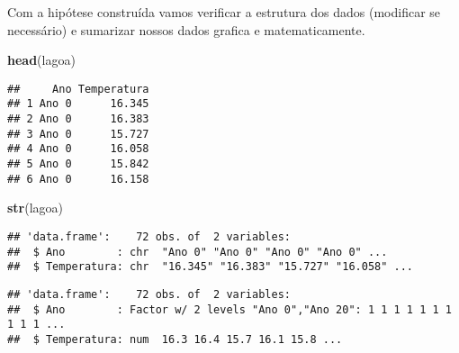 \documentclass[14pt,titlepage, oneside, openany, a4paper]{book}
\newenvironment{Shaded}{\begin{snugshade}}{\end{snugshade}}
\newcommand{\DataTypeTok}[1]{\textcolor[rgb]{0.13,0.29,0.53}{#1}}
\newcommand{\DecValTok}[1]{\textcolor[rgb]{0.00,0.00,0.81}{#1}}
\newcommand{\KeywordTok}[1]{\textcolor[rgb]{0.13,0.29,0.53}{\textbf{#1}}}
\newcommand{\NormalTok}[1]{#1}
\newcommand{\OperatorTok}[1]{\textcolor[rgb]{0.81,0.36,0.00}{\textbf{#1}}}
\newcommand{\StringTok}[1]{\textcolor[rgb]{0.31,0.60,0.02}{#1}}
\begin{document}
Com a hipótese construída vamos verificar a estrutura dos dados (modificar se necessário) e sumarizar nossos dados grafica e matematicamente.

\begin{Shaded}
\begin{Highlighting}[]
\KeywordTok{head}\NormalTok{(lagoa)}
\end{Highlighting}
\end{Shaded}

\begin{verbatim}
##     Ano Temperatura
## 1 Ano 0      16.345
## 2 Ano 0      16.383
## 3 Ano 0      15.727
## 4 Ano 0      16.058
## 5 Ano 0      15.842
## 6 Ano 0      16.158
\end{verbatim}

\begin{Shaded}
\begin{Highlighting}[]
\KeywordTok{str}\NormalTok{(lagoa)}
\end{Highlighting}
\end{Shaded}

\begin{verbatim}
## 'data.frame':    72 obs. of  2 variables:
##  $ Ano        : chr  "Ano 0" "Ano 0" "Ano 0" "Ano 0" ...
##  $ Temperatura: chr  "16.345" "16.383" "15.727" "16.058" ...
\end{verbatim}

\begin{Shaded}
\end{Shaded}

\begin{verbatim}
## 'data.frame':    72 obs. of  2 variables:
##  $ Ano        : Factor w/ 2 levels "Ano 0","Ano 20": 1 1 1 1 1 1 1 1 1 1 ...
##  $ Temperatura: num  16.3 16.4 15.7 16.1 15.8 ...
\end{verbatim}

\begin{Shaded}
\end{Shaded}
\end{document}

